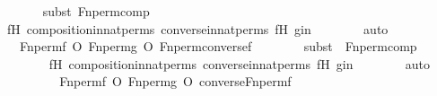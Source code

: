 \begin{isabellebody}
\ \ \ \ \ \ \isamarkupfalse%
{\isacharparenleft}{\kern0pt}subst\ Fn{\isacharunderscore}{\kern0pt}perm{\isacharprime}{\kern0pt}{\isacharunderscore}{\kern0pt}comp{\isacharparenright}{\kern0pt}\isanewline
\ \ \ \ \ \ \isamarkupfalse%
\ fH\ composition{\isacharunderscore}{\kern0pt}in{\isacharunderscore}{\kern0pt}nat{\isacharunderscore}{\kern0pt}perms\ converse{\isacharunderscore}{\kern0pt}in{\isacharunderscore}{\kern0pt}nat{\isacharunderscore}{\kern0pt}perms\ fH\ gin\isanewline
\ \ \ \ \ \ \isamarkupfalse%
\ auto\isanewline
\ \ \ \ \isamarkupfalse%
\ \isamarkupfalse%
\ {\isachardoublequoteopen}{\isachardot}{\kern0pt}{\isachardot}{\kern0pt}{\isachardot}{\kern0pt}\ {\isacharequal}{\kern0pt}\ Fn{\isacharunderscore}{\kern0pt}perm{\isacharprime}{\kern0pt}{\isacharparenleft}{\kern0pt}f{\isacharparenright}{\kern0pt}\ O\ Fn{\isacharunderscore}{\kern0pt}perm{\isacharprime}{\kern0pt}{\isacharparenleft}{\kern0pt}g{\isacharparenright}{\kern0pt}\ O\ Fn{\isacharunderscore}{\kern0pt}perm{\isacharprime}{\kern0pt}{\isacharparenleft}{\kern0pt}converse{\isacharparenleft}{\kern0pt}f{\isacharparenright}{\kern0pt}{\isacharparenright}{\kern0pt}{\isachardoublequoteclose}\ \isanewline
\ \ \ \ \ \ \isamarkupfalse%
{\isacharparenleft}{\kern0pt}subst\ {\isacharparenleft}{\kern0pt}{}{\isacharparenright}{\kern0pt}\ Fn{\isacharunderscore}{\kern0pt}perm{\isacharprime}{\kern0pt}{\isacharunderscore}{\kern0pt}comp{\isacharparenright}{\kern0pt}\isanewline
\ \ \ \ \ \ \isamarkupfalse%
\ fH\ composition{\isacharunderscore}{\kern0pt}in{\isacharunderscore}{\kern0pt}nat{\isacharunderscore}{\kern0pt}perms\ converse{\isacharunderscore}{\kern0pt}in{\isacharunderscore}{\kern0pt}nat{\isacharunderscore}{\kern0pt}perms\ fH\ gin\isanewline
\ \ \ \ \ \ \isamarkupfalse%
\ auto\isanewline
\ \ \ \ \isamarkupfalse%
\ \isamarkupfalse%
\ {\isachardoublequoteopen}{\isachardot}{\kern0pt}{\isachardot}{\kern0pt}{\isachardot}{\kern0pt}\ {\isacharequal}{\kern0pt}\ Fn{\isacharunderscore}{\kern0pt}perm{\isacharprime}{\kern0pt}{\isacharparenleft}{\kern0pt}f{\isacharparenright}{\kern0pt}\ O\ Fn{\isacharunderscore}{\kern0pt}perm{\isacharprime}{\kern0pt}{\isacharparenleft}{\kern0pt}g{\isacharparenright}{\kern0pt}\ O\ converse{\isacharparenleft}{\kern0pt}Fn{\isacharunderscore}{\kern0pt}perm{\isacharprime}{\kern0pt}{\isacharparenleft}{\kern0pt}f{\isacharparenright}{\kern0pt}{\isacharparenright}{\kern0pt}{\isachardoublequoteclose}\ \isanewline
\ \ \ \ \ \ \isamarkupfalse%

\end{isabellebody}
